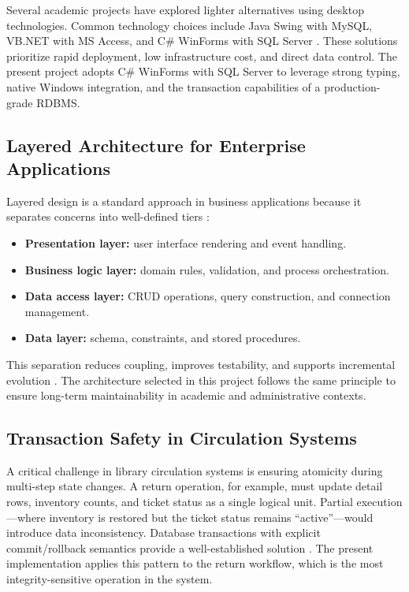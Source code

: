 \documentclass[12pt,a4paper]{article}
\begin{document}
Several academic projects have explored lighter alternatives using desktop technologies. Common technology choices include Java Swing with MySQL, VB.NET with MS Access, and C\# WinForms with SQL Server \cite{dotnet}. These solutions prioritize rapid deployment, low infrastructure cost, and direct data control. The present project adopts C\# WinForms with SQL Server to leverage strong typing, native Windows integration, and the transaction capabilities of a production-grade RDBMS.

\subsection{Layered Architecture for Enterprise Applications}
Layered design is a standard approach in business applications because it separates concerns into well-defined tiers \cite{fowler}:
\begin{itemize}[leftmargin=1.5cm]
    \item \textbf{Presentation layer:} user interface rendering and event handling.
    \item \textbf{Business logic layer:} domain rules, validation, and process orchestration.
    \item \textbf{Data access layer:} CRUD operations, query construction, and connection management.
    \item \textbf{Data layer:} schema, constraints, and stored procedures.
\end{itemize}
This separation reduces coupling, improves testability, and supports incremental evolution \cite{pressman}. The architecture selected in this project follows the same principle to ensure long-term maintainability in academic and administrative contexts.

\subsection{Transaction Safety in Circulation Systems}
A critical challenge in library circulation systems is ensuring atomicity during multi-step state changes. A return operation, for example, must update detail rows, inventory counts, and ticket status as a single logical unit. Partial execution---where inventory is restored but the ticket status remains ``active''---would introduce data inconsistency. Database transactions with explicit commit/rollback semantics provide a well-established solution \cite{sqlserver}. The present implementation applies this pattern to the return workflow, which is the most integrity-sensitive operation in the system.
\end{document}
